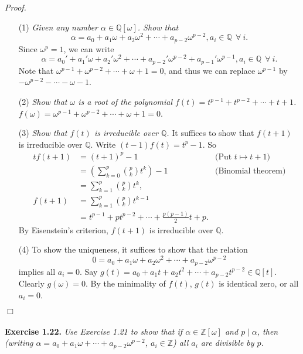 \documentclass{article}
\begin{document}
\emph{Proof.}
\begin{enumerate}
\item[(1)]
\emph{Given any number $\alpha \in \mathbb{Q}[\omega]$.
Show that}
$$\alpha = a_0 + a_1\omega + a_2\omega^2 + \cdots + a_{p-2}\omega^{p-2},
a_i \in \mathbb{Q} \:\: \forall \: i.$$
Since $\omega^p = 1$, we can write
$$\alpha = a_0' + a_1'\omega + a_2'\omega^2 + \cdots + a_{p-2}'\omega^{p-2} + a_{p-1}'\omega^{p-1},
a_i \in \mathbb{Q} \:\: \forall \: i.$$
Note that $\omega^{p-1} + \omega^{p-2} + \cdots + \omega + 1 = 0$,
and thus we can replace $\omega^{p-1}$
by $- \omega^{p-2} - \cdots - \omega - 1$.
\item[(2)]
\emph{Show that $\omega$ is a root of the polynomial
$f(t) = t^{p-1} + t^{p-2} + \cdots + t + 1$.}
$f(\omega) = \omega^{p-1} + \omega^{p-2} + \cdots + \omega + 1 = 0$.
\item[(3)]
\emph{Show that $f(t)$ is irreducible over $\mathbb{Q}$.}
It suffices to show that $f(t+1)$ is irreducible over $\mathbb{Q}$.
Write $(t-1)f(t) = t^p - 1$. So
\begin{align*}
tf(t+1)
&= (t+1)^p - 1
  &\text{(Put $t \mapsto t+1$)} \\
&= \left( \sum_{k=0}^{p}{p \choose k}t^k \right) - 1
  &\text{(Binomial theorem)} \\
&= \sum_{k=1}^{p}{p \choose k}t^k, \\
f(t+1)
&= \sum_{k=1}^{p}{p \choose k}t^{k-1} \\
&= t^{p-1} + p t^{p-2} + \cdots + \frac{p(p-1)}{2} t + p.
\end{align*}
By Eisenstein's criterion, $f(t+1)$ is irreducible over $\mathbb{Q}$.
\item[(4)]
To show the uniqueness, it suffices to show that the relation
$$0 = a_0 + a_1\omega + a_2\omega^2 + \cdots + a_{p-2}\omega^{p-2}$$
implies all $a_i = 0$.
Say $g(t) = a_0 + a_1 t + a_2 t^2 + \cdots + a_{p-2} t^{p-2} \in \mathbb{Q}[t]$.
Clearly $g(\omega) = 0$. By the minimality of $f(t)$, $g(t)$ is identical zero,
or all $a_i = 0$.
\end{enumerate}
$\Box$ \\\\






\textbf{Exercise 1.22.}
\emph{Use Exercise 1.21 to show that if
$\alpha \in \mathbb{Z}[\omega]$ and $p \mid \alpha$,
then (writing $\alpha = a_0 + a_1 \omega + \cdots + a_{p-2} \omega^{p-2}$,
$a_i \in \mathbb{Z}$) all $a_i$ are divisible by $p$. } \\
\end{document}
